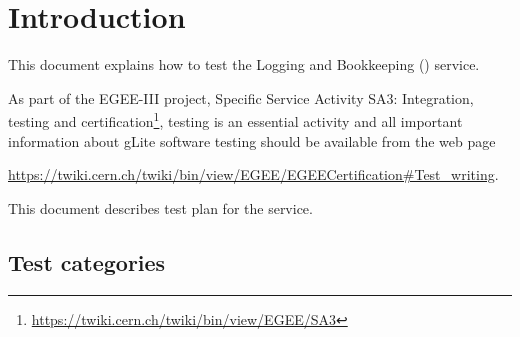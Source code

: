 %
%
\section{Introduction}

This document explains how to test the Logging and Bookkeeping (\LB) service.

As part of the EGEE-III project, Specific Service Activity SA3: Integration,
testing and certification\footnote{\url{https://twiki.cern.ch/twiki/bin/view/EGEE/SA3}},
testing is an essential activity and all important information about gLite software
testing should be available from the web page

\begin{center}
\url{https://twiki.cern.ch/twiki/bin/view/EGEE/EGEECertification#Test_writing}.
\end{center}

This document describes test plan for the \LB service.


\subsection{Test categories}

%

